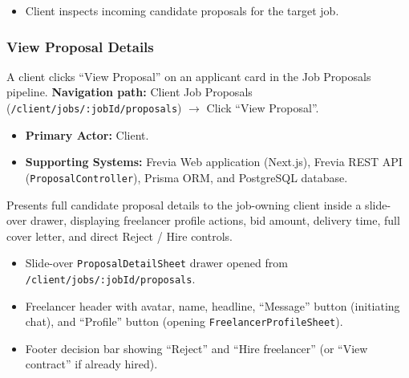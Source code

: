 \begin{itemize}[leftmargin=1.6em,topsep=3pt,itemsep=2pt,parsep=0pt,label=$\bullet$]
    \item Client inspects incoming candidate proposals for the target job.
\end{itemize}

\subsubsection{View Proposal Details}

A client clicks ``View Proposal'' on an applicant card in the Job Proposals pipeline.\newline
\textbf{Navigation path:} Client Job Proposals (\texttt{/client/jobs/:jobId/proposals}) $\rightarrow$ Click ``View Proposal''.


\begin{itemize}[leftmargin=1.6em,topsep=3pt,itemsep=2pt,parsep=0pt,label=$\bullet$]
    \item \textbf{Primary Actor:} Client.
    \item \textbf{Supporting Systems:} Frevia Web application (Next.js), Frevia REST API (\texttt{ProposalController}), Prisma ORM, and PostgreSQL database.
\end{itemize}

\noindent Presents full candidate proposal details to the job-owning client inside a slide-over drawer, displaying freelancer profile actions, bid amount, delivery time, full cover letter, and direct Reject / Hire controls.

\begin{itemize}[leftmargin=1.6em,topsep=3pt,itemsep=2pt,parsep=0pt,label=$\bullet$]
    \item Slide-over \texttt{Proposal\allowbreak{}Detail\allowbreak{}Sheet} drawer opened from \texttt{/\allowbreak{}client/\allowbreak{}jobs/\allowbreak{}:\allowbreak{}jobId/\allowbreak{}proposals}.
    \item Freelancer header with avatar, name, headline, ``Message'' button (initiating chat), and ``Profile'' button (opening \texttt{FreelancerProfileSheet}).
    \item Footer decision bar showing ``Reject'' and ``Hire freelancer'' (or ``View contract'' if already hired).
\end{itemize}


